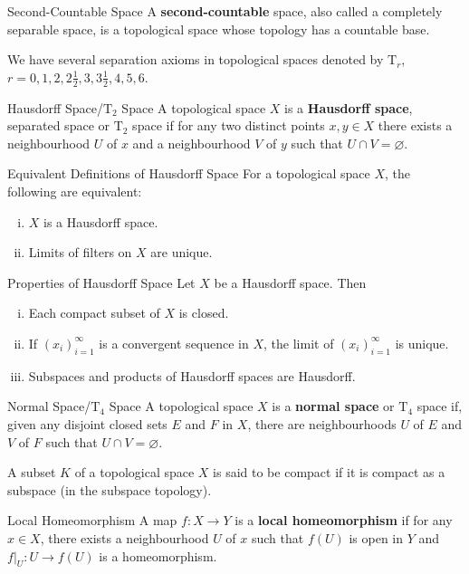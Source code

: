 \documentclass{report}
\begin{document}
\begin{definition}{Second-Countable Space}{}
	A \textbf{second-countable} space, also called a completely separable space, is a topological space whose topology has a countable base.
\end{definition}


We have several separation axioms in topological spaces denoted by $\mathrm{T}_r$, $r=0,1,2,2\frac{1}{2},3,3\frac{1}{2},4,5,6$.
\begin{definition}{Hausdorff Space/$\mathrm{T}_2$ Space}{}
	A topological space $X$ is a \textbf{Hausdorff space}, separated space or $\mathrm{T}_2$ space if for any two distinct points $x,y\in X$ there exists a neighbourhood $U$ of $x$ and a neighbourhood $V$ of $y$ such that $U\cap V=\varnothing$.
\end{definition}

\begin{proposition}{Equivalent Definitions of Hausdorff Space}{}
	For a topological space $X$, the following are equivalent:
	\begin{enumerate}[(i)]
		\item $X$ is a Hausdorff space.
		\item Limits of filters on $X$ are unique.
	\end{enumerate}
\end{proposition}

\begin{proposition}{Properties of Hausdorff Space}{}
	Let $X$ be a Hausdorff space. Then
	\begin{enumerate}[(i)]
		\item Each compact subset of $X$ is closed.
		\item If $(x_i)_{i=1}^{\infty}$ is a convergent sequence in $X$, the limit of $(x_i)_{i=1}^{\infty}$ is unique.
		\item Subspaces and products of Hausdorff spaces are Hausdorff.
	\end{enumerate}
\end{proposition}

\begin{definition}{Normal Space/$\mathrm{T}_4$ Space}{}
	A topological space $X$ is a \textbf{normal space} or $\mathrm{T}_4$ space if, given any disjoint closed sets $E$ and $F$ in $X$, there are neighbourhoods $U$ of $E$ and $V$ of $F$ such that $U\cap V=\varnothing$.
\end{definition}


A subset $K$ of a topological space $X$ is said to be compact if it is compact as a subspace (in the subspace topology).
\begin{definition}{Local Homeomorphism}{}
	A map $f:X\to Y$ is a \textbf{local homeomorphism} if for any $x\in X$, there exists a neighbourhood $U$ of $x$ such that $f(U)$ is open in $Y$ and $f|_U:U\to f(U)$ is a homeomorphism.
\end{definition}
\end{document}
